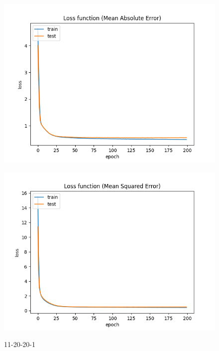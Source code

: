 \begin{figure}[!htb]
    \begin{minipage}{0.5\textwidth}
        \centering
        \includegraphics[width=01\textwidth]{../images/11-20-20/Loss_function(Mean_Absolute_Error).png}
        \label{fig:11-20-20-1.1}
    \end{minipage}\hfill
    \begin{minipage}{0.5\textwidth}
        \centering
        \includegraphics[width=01\textwidth]{../images/11-20-20/Loss_function(Mean_Squared_Error).png}
        \label{fig:11-20-20-1.1.2}
    \end{minipage}
    \caption{11-20-20-1}
\end{figure}

